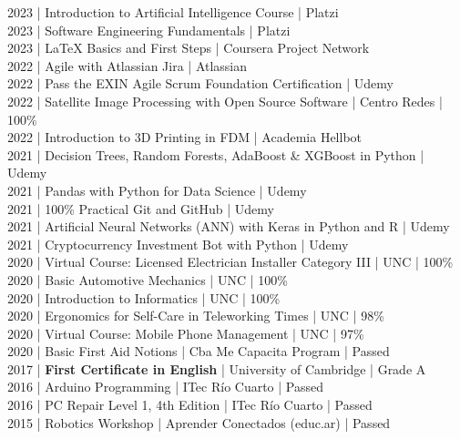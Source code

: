 {2023 | Introduction to Artificial Intelligence Course | Platzi \\
2023 | Software Engineering Fundamentals | Platzi \\
2023 | LaTeX Basics and First Steps | Coursera Project Network \\
2022 | Agile with Atlassian Jira | Atlassian \\
2022 | Pass the EXIN Agile Scrum Foundation Certification | Udemy \\
2022 | Satellite Image Processing with Open Source Software | Centro Redes | 100\% \\
2022 | Introduction to 3D Printing in FDM | Academia Hellbot \\
2021 | Decision Trees, Random Forests, AdaBoost \& XGBoost in Python | Udemy \\
2021 | Pandas with Python for Data Science | Udemy \\
2021 | 100\% Practical Git and GitHub | Udemy \\
2021 | Artificial Neural Networks (ANN) with Keras in Python and R | Udemy \\
2021 | Cryptocurrency Investment Bot with Python | Udemy \\
2020 | Virtual Course: Licensed Electrician Installer Category III | UNC | 100\% \\
2020 | Basic Automotive Mechanics | UNC | 100\% \\
2020 | Introduction to Informatics | UNC | 100\% \\
2020 | Ergonomics for Self-Care in Teleworking Times | UNC | 98\% \\
2020 | Virtual Course: Mobile Phone Management | UNC | 97\% \\
2020 | Basic First Aid Notions | Cba Me Capacita Program | Passed \\
2017 | \textbf{First Certificate in English} | University of Cambridge | Grade A \\
2016 | Arduino Programming | ITec Río Cuarto | Passed \\
2016 | PC Repair Level 1, 4th Edition | ITec Río Cuarto | Passed \\
2015 | Robotics Workshop | Aprender Conectados (educ.ar) | Passed \\
}

\vspace{12pt}